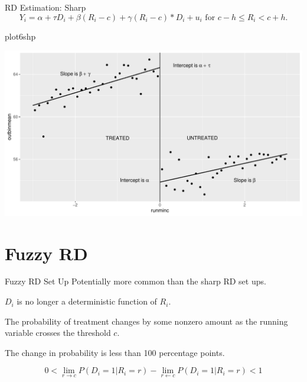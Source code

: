 \documentclass[
  ignorenonframetext,
]{beamer}
\newenvironment{Shaded}{\begin{snugshade}}{\end{snugshade}}
\newcommand{\NormalTok}[1]{#1}
\begin{document}
\begin{frame}[fragile]{RD Estimation: Sharp}
\protect\hypertarget{rd-estimation-sharp-4}{}
\[
Y_i=\alpha+\tau D_i+\beta(R_i-c)+\gamma (R_i-c)*D_i+u_i \text{ for }  c-h\leq R_i< c+h. 
\]

\tiny

\begin{Shaded}
\begin{Highlighting}[]
\NormalTok{plot6shp}
\end{Highlighting}
\end{Shaded}

\includegraphics{Slides9_RD_files/figure-beamer/shp7b-1.pdf}
\end{frame}

\hypertarget{fuzzy-rd}{%
\section{Fuzzy RD}\label{fuzzy-rd}}

\begin{frame}{Fuzzy RD Set Up}
\protect\hypertarget{fuzzy-rd-set-up}{}
Potentially more common than the sharp RD set ups.

\(D_i\) is no longer a deterministic function of \(R_i\).

The probability of treatment changes by some nonzero amount as the
running variable crosses the threshold \(c\).

The change in probability is less than 100 percentage points.

\[
0<\lim\limits_{r\rightarrow c}P(D_i=1|R_i=r)-\lim\limits_{r\leftarrow c}P(D_i=1|R_i=r)<1
\]
\end{frame}
\end{document}
